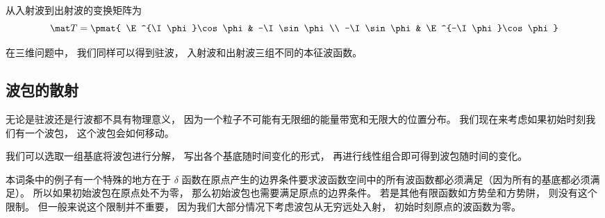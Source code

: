 从入射波到出射波的变换矩阵为
\begin{equation}
\mat T = \pmat{
\E^{\I\phi}\cos\phi & -\I \sin\phi \\
-\I \sin\phi & \E^{-\I\phi}\cos\phi
}\end{equation}

在三维问题中， 我们同样可以得到驻波， 入射波和出射波三组不同的本征波函数。

\subsection{波包的散射}
无论是驻波还是行波都不具有物理意义， 因为一个粒子不可能有无限细的能量带宽和无限大的位置分布。 我们现在来考虑如果初始时刻我们有一个波包， 这个波包会如何移动。

我们可以选取一组基底将波包进行分解， 写出各个基底随时间变化的形式， 再进行线性组合即可得到波包随时间的变化。

本词条中的例子有一个特殊的地方在于 $\delta$ 函数在原点产生的边界条件要求波函数空间中的所有波函数都必须满足（因为所有的基底都必须满足）。 所以如果初始波包在原点处不为零， 那么初始波包也需要满足原点的边界条件。 若是其他有限函数如方势垒和方势阱， 则没有这个限制。 但一般来说这个限制并不重要， 因为我们大部分情况下考虑波包从无穷远处入射， 初始时刻原点的波函数为零。


